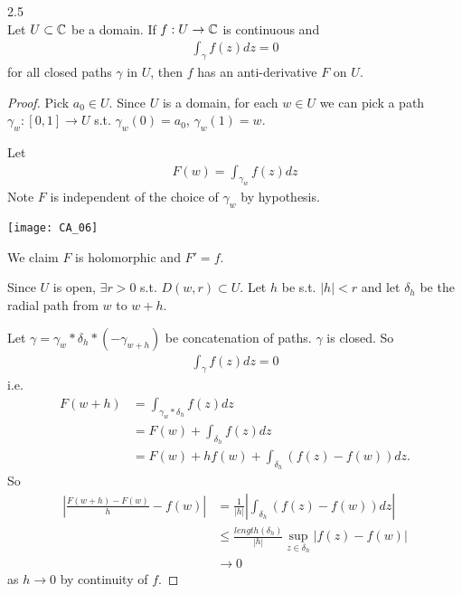 \documentclass[a4paper]{article}
\begin{document}
\begin{prop} 2.5\\
Let $U \subset \mathbb{C}$ be a domain. If $f: U \to \mathbb{C}$ is continuous and
\begin{equation*}
\begin{aligned}
\int_\gamma f(z) dz =0 
\end{aligned}
\end{equation*}
for all closed paths $\gamma$ in $U$, then $f$ has an anti-derivative $F$ on $U$.
\begin{proof}
Pick $a_0 \in U$. Since $U$ is a domain, for each $w \in U$ we can pick a path $\gamma_w:[0,1] \to U$ s.t. $\gamma_w(0) = a_0$, $\gamma_w(1) = w$.

Let
\begin{equation*}
\begin{aligned}
F(w) = \int_{\gamma_w} f(z) dz
\end{aligned}
\end{equation*}
Note $F$ is independent of the choice of $\gamma_w$ by hypothesis.

\texttt{[image: CA\_06]}

We claim $F$ is holomorphic and $F' = f$.

Since $U$ is open, $\exists r>0$ s.t. $D(w,r) \subset U$. Let $h$ be s.t. $|h|<r$ and let $\delta_h$ be the radial path from $w$ to $w+h$. 

Let $\gamma = \gamma_w * \delta_h * (-\gamma_{w+h})$ be concatenation of paths. $\gamma$ is closed. So
\begin{equation*}
\begin{aligned}
\int_\gamma f(z) dz = 0
\end{aligned}
\end{equation*}
i.e.
\begin{equation*}
\begin{aligned}
F(w+h) &= \int_{\gamma_w * \delta_h} f(z) dz\\
&=F(w) + \int_{\delta_h} f(z) dz\\
&= F(w) + hf(w) + \int_{\delta_h} (f(z)-f(w)) dz.
\end{aligned}
\end{equation*}
So
\begin{equation*}
\begin{aligned}
\left|\frac{F(w+h)-F(w)}{h} - f(w)\right| &= \frac{1}{|h|} \left|\int_{\delta_h} (f(z)-f(w)) dz\right|\\
& \leq \frac{length(\delta_h)}{|h|} \sup_{z \in \delta_h} |f(z)-f(w)|\\
&\to 0
\end{aligned}
\end{equation*}
as $h \to 0$ by continuity of $f$.
\end{proof}
\end{prop}
\end{document}
